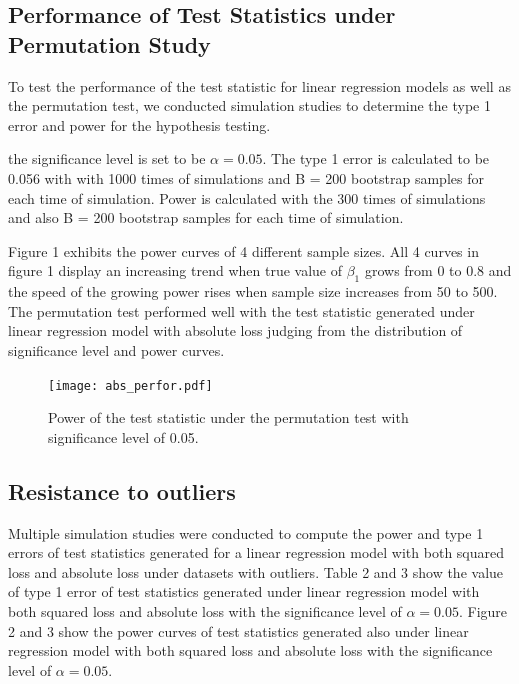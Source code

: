 \documentclass[12pt]{article}
\begin{document}
\subsection{Performance of Test Statistics under Permutation Study}

To test the performance of the test statistic for linear regression models as well as the permutation test, we conducted simulation studies to determine the type 1 error and power for the hypothesis testing.

the significance level is set to be $\alpha=0.05$. The type 1 error is calculated to be 0.056 with with 1000 times of simulations and B = 200 bootstrap samples for each time of simulation. Power is calculated with the 300 times of simulations and also B = 200 bootstrap samples for each time of simulation. 

Figure 1 exhibits the power curves of 4 different sample sizes. All 4 curves in figure 1 display an increasing trend when true value of $\beta_1$ grows from 0 to 0.8 and the speed of the growing power rises when sample size increases from 50 to 500. The permutation test performed well with the test statistic generated under linear regression model with absolute loss judging from the distribution of significance level and power curves.

\begin{figure}[ht]
\texttt{[image: abs\_perfor.pdf]}
\centering
\caption{Power of the test statistic under the permutation test with significance level of 0.05.}
\end{figure}

\subsection{Resistance to outliers}

Multiple simulation studies were conducted to compute the power and type 1 errors of test statistics generated for a linear regression model with both squared loss and absolute loss under datasets with outliers. Table 2 and 3 show the value of type 1 error of test statistics generated under linear regression model with both squared loss and absolute loss with the significance level of $\alpha=0.05$. Figure 2 and 3 show the power curves of test statistics generated also under linear regression model with both squared loss and absolute loss with the significance level of $\alpha=0.05$. 
\end{document}
